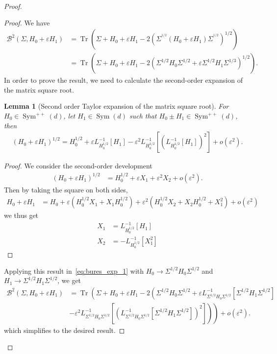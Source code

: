 \documentclass[11pt]{article}
\newtheorem{lem}{Lemma}
\newcommand{\tr}[1]{\operatorname{Tr}\left({#1}\right)}
\begin{document}
\begin{proof}
\begin{proof} 
We have
\begin{align}
\mathcal{B}^2(\Sigma, H_0 + \varepsilon H_1) &= \tr{ \Sigma + H_0 + \varepsilon H_1 - 2 \left(\Sigma^{^{1/2}} (H_0 + \varepsilon H_1) \Sigma^{^{1/2}}\right)^{1/2} } \\
&= \tr{\Sigma +  H_0 + \varepsilon H_1 - 2 \left(\Sigma^{1/2}H_0\Sigma^{1/2}  + \varepsilon \Sigma^{1/2} H_1\Sigma^{1/3}\right)^{1/2} }. \label{eq:bures_exp_1}
\end{align}
In order to prove the result, we need to calculate the second-order expansion of the matrix square root.
\begin{lem}[Second order Taylor expansion of the matrix square root] \label{lem:taylor_square_root}
For $H_0 \in \operatorname{Sym}^{++}(d)$, let $H_1 \in \operatorname{Sym}(d)$ such that ${H_0 \pm H_1 \in  \operatorname{Sym}^{++}(d)}$, then 
\begin{align*}
(H_0 + \varepsilon H_1)^{1/2} = H_0^{1/2} + \varepsilon L_{H_0^{1/2}}^{-1}[H_1] - \varepsilon^2   L_{H_0^{1/2}}^{-1}\left[\left(L_{H_0^{1/2}}^{-1}[H_1]\right)^2\right]  + o(\varepsilon^2) .
\end{align*} 
\end{lem}
\begin{proof}
We consider the second-order development
\begin{align*}
(H_0 + \varepsilon H_1)^{1/2} &= H_0^{1/2} + \varepsilon X_1  + \varepsilon^2 X_2 + o(\varepsilon^2).
\end{align*} 
Then by taking the square on both sides,
\begin{align*}
H_0 + \varepsilon H_1 &= H_0 + \varepsilon ( H_0^{1/2} X_1 + X_1 H_0^{1/2})  + \varepsilon^2 (H_0^{1/2} X_2 +  X_2 H_0^{1/2} + X_1^2) +  o(\varepsilon^2)
\end{align*}
we thus get 
\begin{align*}
X_1 &= L_{H_0^{1/2}}^{-1}[H_1] \\
X_2 &= - L_{H_0^{1/2}}^{-1}[X_1^2]
\end{align*}
\end{proof}
Applying this result in~\eqref{eq:bures_exp_1} with $H_0 \to \Sigma^{1/2} H_0 \Sigma^{1/2}$ and $H_1 \to \Sigma^{1/2} H_1 \Sigma^{1/2}$, we get 
\begin{align*}
\mathcal{B}^2(\Sigma, H_0 + \varepsilon H_1) &= \operatorname{Tr} \left(\Sigma + H_0 + \varepsilon H_1 - 2 \left( \Sigma^{1/2} H_0 \Sigma^{1/2} + \varepsilon L_{\Sigma^{1/2} H_0 \Sigma^{1/2}}^{-1}[\Sigma^{1/2} H_1 \Sigma^{1/2}] \right. \right.\\
& \left. \left. - \varepsilon^2   L_{\Sigma^{1/2} H_0 \Sigma^{1/2}}^{-1}\left[\left(L_{\Sigma^{1/2} H_0 \Sigma^{1/2}}^{-1}[\Sigma^{1/2} H_1 \Sigma^{1/2}]\right)^2\right]  \right) \right) +o(\varepsilon^2) \nonumber .
\end{align*}
which simplifies to the desired result.
\end{proof}





\end{proof}
\end{document}
